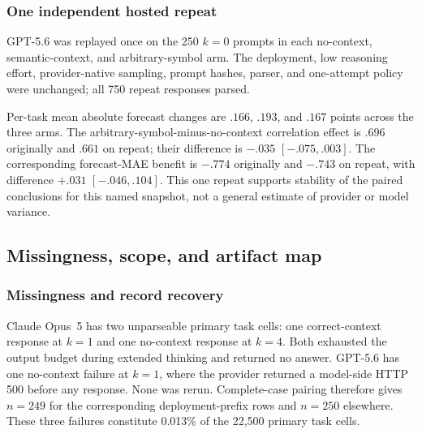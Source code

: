\subsubsection{One independent hosted repeat}
GPT-5.6 was replayed once on the 250 \(k=0\) prompts in each no-context,
semantic-context, and arbitrary-symbol arm. The deployment, low reasoning effort,
provider-native sampling, prompt hashes, parser, and one-attempt policy were
unchanged; all 750 repeat responses parsed.

\begin{center}
\begin{minipage}{\linewidth}
\centering
{}
\label{tab:coin-city-gpt-repeat}
\scriptsize
\setlength{\tabcolsep}{2.5pt}
\resizebox{\linewidth}{!}{}
\end{minipage}
\end{center}

Per-task mean absolute forecast changes are \(.166\), \(.193\), and \(.167\)
points across the three arms. The arbitrary-symbol-minus-no-context correlation
effect is \(.696\) originally and \(.661\) on repeat; their difference is
\(-.035\) \([-.075,.003]\). The corresponding forecast-MAE benefit is
\(-.774\) originally and \(-.743\) on repeat, with difference \(+.031\)
\([-.046,.104]\). This one repeat supports stability of the paired conclusions
for this named snapshot, not a general estimate of provider or model variance.

\subsection{Missingness, scope, and artifact map}
\label{app:coin-city-limitations}

\subsubsection{Missingness and record recovery}
Claude Opus~5 has two unparseable primary task cells: one correct-context response
at \(k=1\) and one no-context response at \(k=4\). Both exhausted the output
budget during extended thinking and returned no answer. GPT-5.6 has one
no-context failure at \(k=1\), where the provider returned a model-side HTTP 500
before any response. None was rerun. Complete-case pairing therefore gives
\(n=249\) for the corresponding deployment-prefix rows and \(n=250\) elsewhere.
These three failures constitute 0.013\% of the 22,500 primary task cells.

